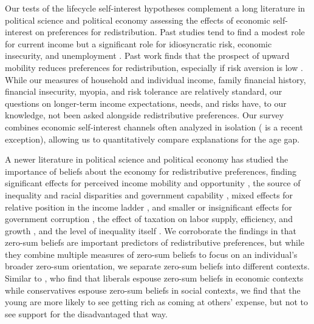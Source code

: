 \documentclass[11pt, headsepline]{article}
\begin{document}
Our tests of the lifecycle self-interest hypotheses complement a long literature in political science and political economy assessing the effects of economic self-interest on preferences for redistribution. Past studies tend to find a modest role for current income \citep{sears1990limited, fong2001social, alesina2011preferences} but a significant role for idiosyncratic risk, economic insecurity, and unemployment \citep{cusack2006risks, rehm2009risks, owens2013material, gartner2017individual, thewissen2019automation, melcher2023economic}. Past work finds that the prospect of upward mobility reduces preferences for redistribution, especially if risk aversion is low \citep{benabou2001social,rainer2008subjective, cojocaru2014prospects}. While our measures of household and individual income, family financial history, financial insecurity, myopia, and risk tolerance are relatively standard, our questions on longer-term income expectations, needs, and risks have, to our knowledge, not been asked alongside redistributive preferences. Our survey combines economic self-interest channels often analyzed in isolation (\cite{bonnet2025explains} is a recent exception), allowing us to quantitatively compare explanations for the age gap.

A newer literature in political science and political economy has studied the importance of beliefs about the economy for redistributive preferences, finding significant effects for perceived income mobility and opportunity \citep{fong2001social, alesina2005preferences, alesina2018intergenerational, bonnet2025explains}, the source of inequality and racial disparities \citep{alesina2021perceptions, almaas2026fairness} and government capability \citep{stantcheva2021understanding}, mixed effects for relative position in the income ladder \citep{cruces2013biased,karadja2017richer,hoy2021relatively}, and smaller or insignificant effects for government corruption \citep{peyton2020does}, the effect of taxation on labor supply, efficiency, and growth \citep{kuziemko2015elastic, stantcheva2021understanding}, and the level of inequality itself \citep{kenworthy2007inequality, kuziemko2015elastic}.  We corroborate the findings in \cite{chinoy2026zero} that zero-sum beliefs are important predictors of redistributive preferences, but while they combine multiple measures of zero-sum beliefs to focus on an individual's broader zero-sum orientation, we separate zero-sum beliefs into different contexts. Similar to \cite{davidai2019politics}, who find that liberals espouse zero-sum beliefs in economic contexts while conservatives espouse zero-sum beliefs in social contexts, we find that the young are more likely to see getting rich as coming at others’ expense, but not to see support for the disadvantaged that way.
\end{document}
